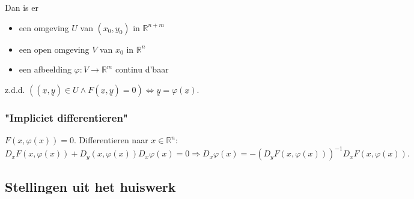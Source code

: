 \documentclass[a4paper]{exam}
\theoremstyle{definition}
\newcommand{\reals}{\mathbb{R}}
\begin{document}
				Dan is er \begin{itemize}
					\item[] een omgeving $ U $ van $ (x_0,y_0) $ in $ \reals^{n+m} $
					\item[] een open omgeving $V$ van $x_0$ in $\reals^n$
					\item[] een afbeelding $ \varphi : V\rightarrow \reals^m $ continu d'baar 
				\end{itemize}
				z.d.d. $ ((\underline{x},\underline{y}) \in U \wedge F(\underline{x},\underline{y})=0) \Leftrightarrow \underline{y}=\varphi (\underline{x}). $
				
			\subsubsection{"Impliciet differentieren"}
				$ F(x,\varphi(x))=0 $. Differentieren naar $ x\in \reals^n $:
				\[ D_x F(x,\varphi(x)) + D_y (x,\varphi(x))D_x \varphi(x) = 0 \Rightarrow D_x \varphi(x) = -(D_y F(x,\varphi(x)))^{-1} D_x F(x,\varphi(x)). \]
				
		\subsection{Stellingen uit het huiswerk}
			
		
		
\end{document}
